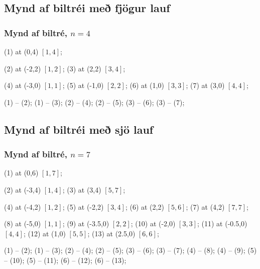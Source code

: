 \subsection{Mynd af biltréi með fjögur lauf}
{
    \frametitle{Mynd af biltré, $n = 4$}
    {
        {
             (1) at (0,4) {$[1, 4]$};

             (2) at (-2,2) {$[1, 2]$};
             (3) at (2,2) {$[3, 4]$};

             (4) at (-3,0) {$[1, 1]$};
             (5) at (-1,0) {$[2, 2]$};
             (6) at (1,0) {$[3, 3]$};
             (7) at (3,0) {$[4, 4]$};

             (1) -- (2);
             (1) -- (3);
             (2) -- (4);
             (2) -- (5);
             (3) -- (6);
             (3) -- (7);
        }
    }
}

\subsection{Mynd af biltréi með sjö lauf}
{
    \frametitle{Mynd af biltré, $n = 7$}
    {
        {
             (1) at (0,6) {$[1, 7]$};

             (2) at (-3,4) {$[1, 4]$};
             (3) at (3,4) {$[5, 7]$};

             (4) at (-4,2) {$[1, 2]$};
             (5) at (-2,2) {$[3, 4]$};
             (6) at (2,2) {$[5, 6]$};
             (7) at (4,2) {$[7, 7]$};

             (8) at (-5,0) {$[1, 1]$};
             (9) at (-3.5,0) {$[2, 2]$};
             (10) at (-2,0) {$[3, 3]$};
             (11) at (-0.5,0) {$[4, 4]$};
             (12) at (1,0) {$[5, 5]$};
             (13) at (2.5,0) {$[6, 6]$};

             (1) -- (2);
             (1) -- (3);
             (2) -- (4);
             (2) -- (5);
             (3) -- (6);
             (3) -- (7);
             (4) -- (8);
             (4) -- (9);
             (5) -- (10);
             (5) -- (11);
             (6) -- (12);
             (6) -- (13);
        }
    }
}

